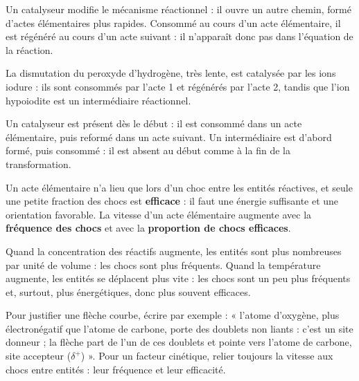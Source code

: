 \begin{propriete}
Un catalyseur modifie le mécanisme réactionnel : il ouvre un autre chemin, formé d'actes élémentaires plus rapides.
Consommé au cours d'un acte élémentaire, il est régénéré au cours d'un acte suivant : il n'apparaît donc pas dans
l'équation de la réaction.
\end{propriete}
\begin{exemple}
La dismutation du peroxyde d'hydrogène, très lente, est catalysée par les ions iodure : ils sont consommés par
l'acte 1 et régénérés par l'acte 2, tandis que l'ion hypoiodite  est un intermédiaire réactionnel.
\end{exemple}
\begin{savoirfaire}
Un catalyseur est présent dès le début : il est consommé dans un acte élémentaire, puis reformé dans un acte suivant.
Un intermédiaire est d'abord formé, puis consommé : il est absent au début comme à la fin de la transformation.
\end{savoirfaire}
\begin{propriete}
Un acte élémentaire n'a lieu que lors d'un choc entre les entités réactives, et seule une petite fraction des chocs
est \textbf{efficace} : il faut une énergie suffisante et une orientation favorable. La vitesse d'un acte élémentaire
augmente avec la \textbf{fréquence des chocs} et avec la \textbf{proportion de chocs efficaces}.
\end{propriete}
\begin{propriete}
Quand la concentration des réactifs augmente, les entités sont plus nombreuses par unité de volume : les chocs sont
plus fréquents. Quand la température augmente, les entités se déplacent plus vite : les chocs sont un peu plus
fréquents et, surtout, plus énergétiques, donc plus souvent efficaces.
\end{propriete}
\begin{rediger}
Pour justifier une flèche courbe, écrire par exemple : « l'atome d'oxygène, plus électronégatif que l'atome de
carbone, porte des doublets non liants : c'est un site donneur ; la flèche part de l'un de ces doublets et pointe vers
l'atome de carbone, site accepteur ($\delta^+$) ». Pour un facteur cinétique, relier toujours la vitesse aux chocs entre
entités : leur fréquence et leur efficacité.
\end{rediger}
\exercices

